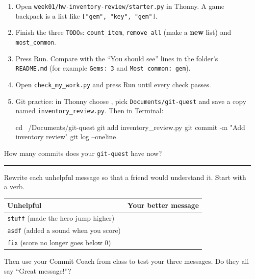\namedateline

\begin{core}
\begin{enumerate}[itemsep=2pt]
  \item Open \texttt{week01/hw-inventory-review/starter.py} in Thonny. A game backpack is a list like \texttt{["gem", "key", "gem"]}.
  \item Finish the three \texttt{TODO}s: \texttt{count\_item}, \texttt{remove\_all} (make a \textbf{new} list) and \texttt{most\_common}.
  \item Press Run. Compare with the \enquote{You should see} lines in the folder's \texttt{README.md} (for example \texttt{Gems: 3} and \texttt{Most common: gem}).
  \item Open \texttt{check\_my\_work.py} and press Run until every check passes.
  \item Git practice: in Thonny choose , pick \texttt{Documents/git-quest} and save a copy named \texttt{inventory\_review.py}. Then in Terminal:
\begin{shellcode}
cd ~/Documents/git-quest
git add inventory_review.py
git commit -m "Add inventory review"
git log --oneline
\end{shellcode}
\end{enumerate}
How many commits does your \texttt{git-quest} have now? \rule{2cm}{0.4pt}
\end{core}

\begin{challenge}
Rewrite each unhelpful message so that a friend would understand it. Start with a verb.
\begin{center}
\renewcommand{\arraystretch}{1.6}
\begin{tabular}{@{}p{4.5cm}p{9cm}@{}}
\toprule
\textbf{Unhelpful} & \textbf{Your better message} \\ \midrule
\texttt{stuff} (made the hero jump higher) & \\ \midrule
\texttt{asdf} (added a sound when you score) & \\ \midrule
\texttt{fix} (score no longer goes below 0) & \\ \bottomrule
\end{tabular}
\end{center}
Then use your Commit Coach from class to test your three messages. Do they all say \enquote{Great message!}?
\end{challenge}

